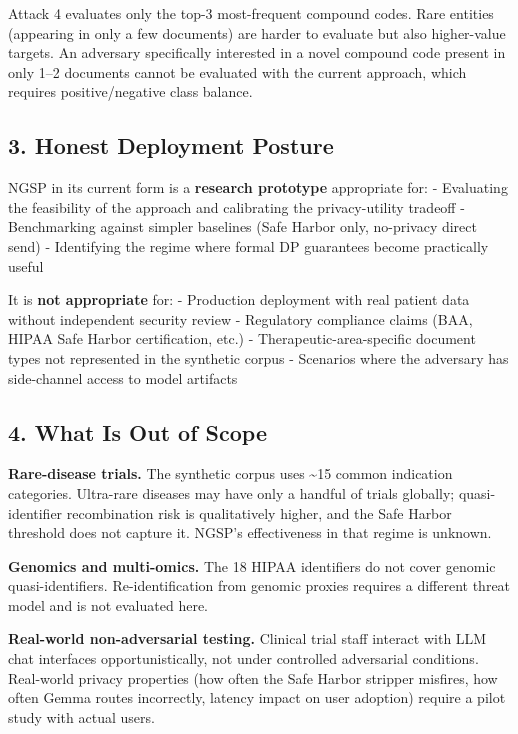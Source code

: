 Attack 4 evaluates only the top-3 most-frequent compound codes. Rare
entities (appearing in only a few documents) are harder to evaluate but
also higher-value targets. An adversary specifically interested in a
novel compound code present in only 1--2 documents cannot be evaluated
with the current approach, which requires positive/negative class
balance.

\subsection{3. Honest Deployment
Posture}\label{honest-deployment-posture}

NGSP in its current form is a \textbf{research prototype} appropriate
for: - Evaluating the feasibility of the approach and calibrating the
privacy-utility tradeoff - Benchmarking against simpler baselines (Safe
Harbor only, no-privacy direct send) - Identifying the regime where
formal DP guarantees become practically useful

It is \textbf{not appropriate} for: - Production deployment with real
patient data without independent security review - Regulatory compliance
claims (BAA, HIPAA Safe Harbor certification, etc.) -
Therapeutic-area-specific document types not represented in the
synthetic corpus - Scenarios where the adversary has side-channel access
to model artifacts

\subsection{4. What Is Out of Scope}\label{what-is-out-of-scope}

\textbf{Rare-disease trials.} The synthetic corpus uses
\textasciitilde15 common indication categories. Ultra-rare diseases may
have only a handful of trials globally; quasi-identifier recombination
risk is qualitatively higher, and the Safe Harbor threshold does not
capture it. NGSP's effectiveness in that regime is unknown.

\textbf{Genomics and multi-omics.} The 18 HIPAA identifiers do not cover
genomic quasi-identifiers. Re-identification from genomic proxies
requires a different threat model and is not evaluated here.

\textbf{Real-world non-adversarial testing.} Clinical trial staff
interact with LLM chat interfaces opportunistically, not under
controlled adversarial conditions. Real-world privacy properties (how
often the Safe Harbor stripper misfires, how often Gemma routes
incorrectly, latency impact on user adoption) require a pilot study with
actual users.

